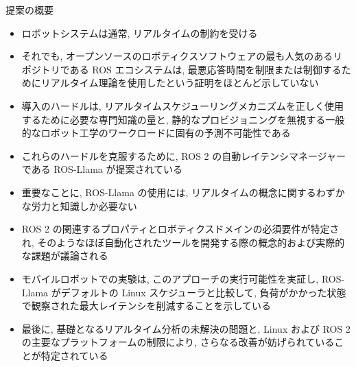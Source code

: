 
\begin{frame}{提案の概要}
    \begin{itemize}
        \item  ロボットシステムは通常, リアルタイムの制約を受ける
\item それでも, オープンソースのロボティクスソフトウェアの最も人気のあるリポジトリである ROS エコシステムは, 最悪応答時間を制限または制御するためにリアルタイム理論を使用したという証明をほとんど示していない
\item 導入のハードルは, リアルタイムスケジューリングメカニズムを正しく使用するために必要な専門知識の量と, 静的なプロビジョニングを無視する一般的なロボット工学のワークロードに固有の予測不可能性である
\item これらのハードルを克服するために, ROS 2 の自動レイテンシマネージャーである ROS-Llama が提案されている
\item 重要なことに, ROS-Llama の使用には, リアルタイムの概念に関するわずかな労力と知識しか必要ない
\item ROS 2 の関連するプロパティとロボティクスドメインの必須要件が特定され, そのようなほぼ自動化されたツールを開発する際の概念的および実際的な課題が議論される
\item モバイルロボットでの実験は, このアプローチの実行可能性を実証し, ROS-Llama がデフォルトの Linux スケジューラと比較して, 負荷がかかった状態で観察された最大レイテンシを削減することを示している
\item 最後に, 基礎となるリアルタイム分析の未解決の問題と, Linux および ROS 2 の主要なプラットフォームの制限により, さらなる改善が妨げられていることが特定されている
    \end{itemize}
\end{frame}
